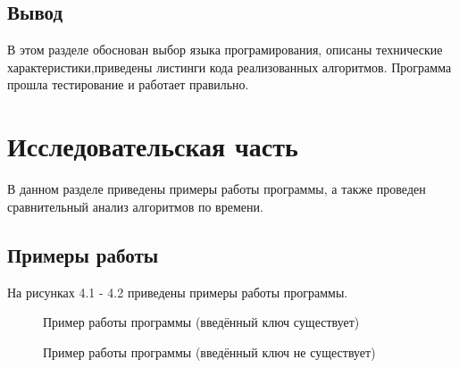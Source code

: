 \documentclass[12pt]{report}
\begin{document}
\section{Вывод}
В этом разделе обоснован выбор языка програмирования, описаны технические характеристики,приведены листинги кода реализованных алгоритмов. Программа прошла тестирование и работает правильно.

\chapter{Исследовательская часть}

В данном разделе приведены примеры работы программы, а также проведен сравнительный анализ алгоритмов по времени.
\section{Примеры работы}
На рисунках 4.1 - 4.2 приведены примеры работы программы.

\begin{figure}[ht!]
	\caption{Пример работы программы (введённый ключ существует)}
\end{figure}

\begin{figure}[ht!]
	\caption{Пример работы программы (введённый ключ не существует)}
\end{figure}
\end{document}
